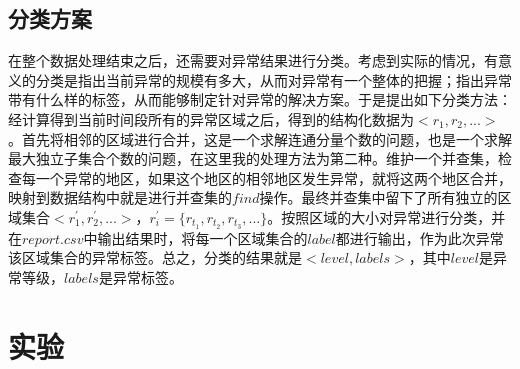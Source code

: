 \documentclass[a4paper, UTF8]{article}
\begin{document}
\begin{CJK}{UTF8}{gbsn}
\subsection{分类方案}
在整个数据处理结束之后，还需要对异常结果进行分类。考虑到实际的情况，有意义的分类是指出当前异常的规模有多大，从而对异常有一个整体的把握；指出异常带有什么样的标签，从而能够制定针对异常的解决方案。于是提出如下分类方法：经计算得到当前时间段所有的异常区域之后，得到的结构化数据为$<r_1,r_2,...>$。首先将相邻的区域进行合并，这是一个求解连通分量个数的问题，也是一个求解最大独立子集合个数的问题，在这里我的处理方法为第二种。维护一个并查集，检查每一个异常的地区，如果这个地区的相邻地区发生异常，就将这两个地区合并，映射到数据结构中就是进行并查集的$find$操作。最终并查集中留下了所有独立的区域集合$<r_1^{'},r_2^{'},...>$，$r_i^{'} = \{r_{t_1},r_{t_2},r_{t_3},...\}$。按照区域的大小对异常进行分类，并在$report.csv$中输出结果时，将每一个区域集合的$label$都进行输出，作为此次异常该区域集合的异常标签。总之，分类的结果就是$<level,labels>$，其中$level$是异常等级，$labels$是异常标签。
\section{实验}

\end{CJK}
\end{document}
